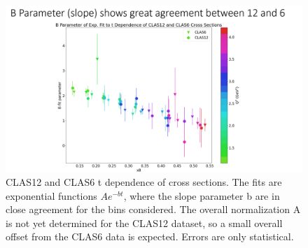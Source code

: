 \begin{figure}[hbt]
	\centering
	\includegraphics[trim={0 0 0 2.2cm},clip,width=0.8\linewidth]{Chapters/Ch5-Further/t_dependence/pics/bslopes.png}

	\caption[Bslopes]{CLAS12 and CLAS6 t dependence of cross sections. The fits are exponential functions $Ae^{-bt}$, where the slope parameter b are in close agreement for the bins considered. The overall normalization A is not yet determined for the CLAS12 dataset, so a small overall offset from the CLAS6 data is expected. Errors are only statistical.}
	\label{fig:bslopes}
\end{figure}
